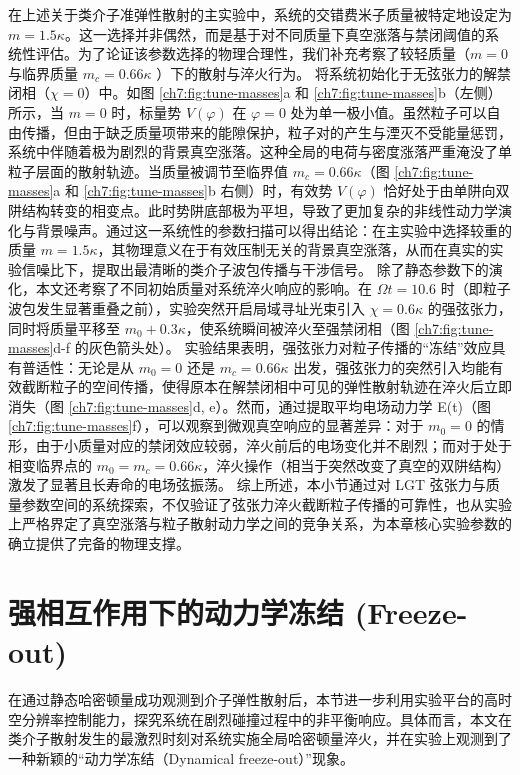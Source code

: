 \documentclass[../main.tex]{subfiles}
\begin{document}
在上述关于类介子准弹性散射的主实验中，系统的交错费米子质量被特定地设定为 $m=1.5\kappa$。这一选择并非偶然，而是基于对不同质量下真空涨落与禁闭阈值的系统性评估。为了论证该参数选择的物理合理性，我们补充考察了较轻质量（$m=0$ 与临界质量 $m_c=0.66\kappa$ ）下的散射与淬火行为。
将系统初始化于无弦张力的解禁闭相（$\chi=0$）中。如图 \ref{ch7:fig:tune-masses}a 和 \ref{ch7:fig:tune-masses}b（左侧）所示，当 $m=0$ 时，标量势 $V(\varphi)$ 在 $\varphi=0$ 处为单一极小值。虽然粒子可以自由传播，但由于缺乏质量项带来的能隙保护，粒子对的产生与湮灭不受能量惩罚，系统中伴随着极为剧烈的背景真空涨落。这种全局的电荷与密度涨落严重淹没了单粒子层面的散射轨迹。当质量被调节至临界值 $m_c=0.66\kappa$（图 \ref{ch7:fig:tune-masses}a 和 \ref{ch7:fig:tune-masses}b 右侧）时，有效势 $V(\varphi)$ 恰好处于由单阱向双阱结构转变的相变点。此时势阱底部极为平坦，导致了更加复杂的非线性动力学演化与背景噪声。通过这一系统性的参数扫描可以得出结论：在主实验中选择较重的质量 $m=1.5\kappa$，其物理意义在于有效压制无关的背景真空涨落，从而在真实的实验信噪比下，提取出最清晰的类介子波包传播与干涉信号。
除了静态参数下的演化，本文还考察了不同初始质量对系统淬火响应的影响。在 $\Omega t=10.6$ 时（即粒子波包发生显著重叠之前），实验突然开启局域寻址光束引入 $\chi=0.6\kappa$ 的强弦张力，同时将质量平移至 $m_0+0.3\kappa$，使系统瞬间被淬火至强禁闭相（图 \ref{ch7:fig:tune-masses}d-f 的灰色箭头处）。
实验结果表明，强弦张力对粒子传播的“冻结”效应具有普适性：无论是从 $m_0=0$ 还是 $m_c=0.66\kappa$ 出发，强弦张力的突然引入均能有效截断粒子的空间传播，使得原本在解禁闭相中可见的弹性散射轨迹在淬火后立即消失（图 \ref{ch7:fig:tune-masses}d, e）。然而，通过提取平均电场动力学 E(t)（图 \ref{ch7:fig:tune-masses}f），可以观察到微观真空响应的显著差异：对于 $m_0=0$ 的情形，由于小质量对应的禁闭效应较弱，淬火前后的电场变化并不剧烈；而对于处于相变临界点的 $m_0=m_c=0.66\kappa$，淬火操作（相当于突然改变了真空的双阱结构）激发了显著且长寿命的电场弦振荡。
综上所述，本小节通过对 LGT 弦张力与质量参数空间的系统探索，不仅验证了弦张力淬火截断粒子传播的可靠性，也从实验上严格界定了真空涨落与粒子散射动力学之间的竞争关系，为本章核心实验参数的确立提供了完备的物理支撑。

\section{强相互作用下的动力学冻结 (Freeze-out)}

在通过静态哈密顿量成功观测到介子弹性散射后，本节进一步利用实验平台的高时空分辨率控制能力，探究系统在剧烈碰撞过程中的非平衡响应。具体而言，本文在类介子散射发生的最激烈时刻对系统实施全局哈密顿量淬火，并在实验上观测到了一种新颖的“动力学冻结（Dynamical freeze-out）”现象。
\end{document}
